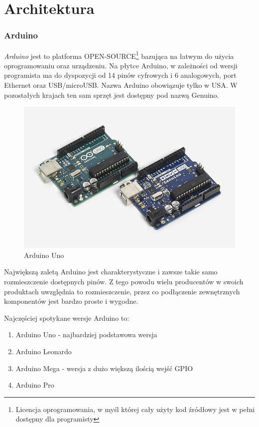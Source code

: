 \documentclass{xmgr}
\begin{document}
\chapter{Architektura}
\subsection{Arduino}
\emph{Arduino} jest to platforma OPEN-SOURCE\footnote{Licencja oprogramowania, w myśl której cały użyty kod źródłowy jest w pełni dostępny dla programisty} bazująca na łatwym do użycia oprogramowaniu oraz urządzeniu. Na płytce Arduino, w zależności od wersji programista ma do dyspozycji od 14 pinów cyfrowych i 6 analogowych, port Ethernet oraz USB/microUSB. Nazwa Arduino obowiązuje tylko w USA. W pozostałych krajach ten sam sprzęt jest dostępny pod nazwą Genuino.

\begin{figure}[!h]
    \centering
    \includegraphics[height=0.4\textwidth]{images/uno.jpg}
    \caption{Arduino Uno \label{Arduino Uno}}
\end{figure}

Największą zaletą Arduino jest charakterystyczne i zawsze takie samo rozmieszczenie dostępnych pinów. Z tego powodu wielu producentów w swoich produktach uwzględnia to rozmieszczenie, przez co podłączenie zewnętrznych komponentów jest bardzo proste i wygodne.

Najczęściej spotykane wersje Arduino to:
\begin{enumerate}
  \item Arduino Uno - najbardziej podstawowa wersja
  \item Arduino Leonardo
  \item Arduino Mega - wersja z dużo większą ilością wejść GPIO
  \item Arduino Pro
\end{enumerate}
 
\end{document}
